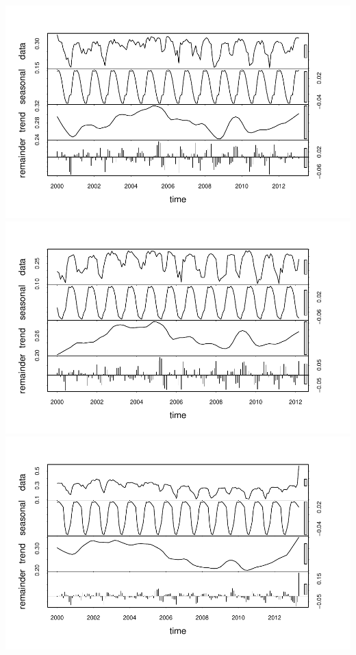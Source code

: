 \documentclass[
  12pt,
]{article}
\begin{document}
\includegraphics{Project_Report_Davidson_McClaugherty_Zungailia_files/figure-latex/TSA-1.pdf}
\includegraphics{Project_Report_Davidson_McClaugherty_Zungailia_files/figure-latex/TSA-2.pdf}
\includegraphics{Project_Report_Davidson_McClaugherty_Zungailia_files/figure-latex/TSA-3.pdf}
\end{document}
